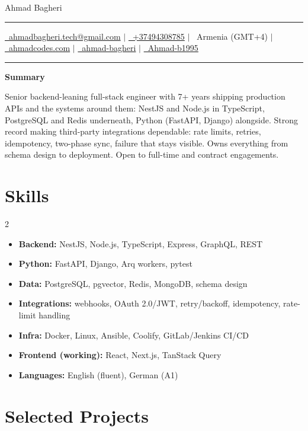 \documentclass[letterpaper,10pt]{article}
\newcommand{\documentTitle}[2]{
  \begin{center}
    {\Huge\color{accentTitle} #1}
    \vspace{7pt}
    {\color{accentLine} \hrule}
    \vspace{2pt}
    \footnotesize{#2}
    \vspace{2pt}
    {\color{accentLine} \hrule}
  \end{center}
}
\newcommand{\tinysection}[1]{
  \phantomsection
  \addcontentsline{toc}{section}{#1}
  {\large{\bfseries\color{accentText}#1} {\color{accentLine} \textbar}}
}
\begin{document}
  \documentTitle{ Ahmad Bagheri }{
    \href{mailto:ahmadbagheri.tech@gmail.com}{\raisebox{-0.15\height}{\faEnvelope}~ahmadbagheri.tech@gmail.com} \quad$|$\quad
    \href{tel:+37494308785}{\raisebox{-0.15\height}{\faPhone}~+37494308785} \quad$|$\quad
    \raisebox{-0.05\height}{\faMapMarker}~Armenia (GMT+4) \quad$|$\quad
    \href{https://ahmadcodes.com}{\raisebox{-0.15\height}{\faGlobe}~ahmadcodes.com} \quad$|$\quad
    \href{https://www.linkedin.com/in/ahmad-bagheri/}{\raisebox{-0.15\height}{\faLinkedin}~ahmad-bagheri} \quad$|$\quad
    \href{https://github.com/Ahmad-b1995}{\raisebox{-0.15\height}{\faGithub}~Ahmad-b1995}
  }

  \tinysection{Summary}
  Senior backend-leaning full-stack engineer with 7+ years shipping production APIs and the systems around them: NestJS and Node.js in TypeScript, PostgreSQL and Redis underneath, Python (FastAPI, Django) alongside. Strong record making third-party integrations dependable: rate limits, retries, idempotency, two-phase sync, failure that stays visible. Owns everything from schema design to deployment. Open to full-time and contract engagements.

  \section{Skills}
  \begin{multicols}{2}
    \begin{itemize}[itemsep=-2px, parsep=1pt, leftmargin=10pt, label={}]
      \item \textbf{Backend:} NestJS, Node.js, TypeScript, Express, GraphQL, REST
      \item \textbf{Python:} FastAPI, Django, Arq workers, pytest
      \item \textbf{Data:} PostgreSQL, pgvector, Redis, MongoDB, schema design
      \item \textbf{Integrations:} webhooks, OAuth 2.0/JWT, retry/backoff, idempotency, rate-limit handling
      \item \textbf{Infra:} Docker, Linux, Ansible, Coolify, GitLab/Jenkins CI/CD
      \item \textbf{Frontend (working):} React, Next.js, TanStack Query
      \item \textbf{Languages:} English (fluent), German (A1)
    \end{itemize}
  \end{multicols}

  \section{Selected Projects}
\end{document}
